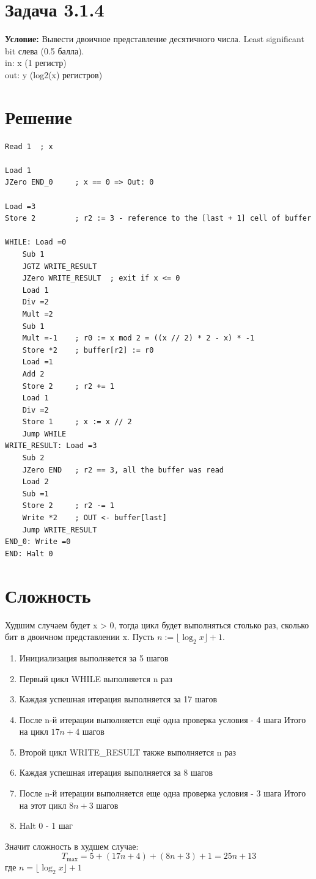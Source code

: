 \documentclass[12pt]{article}
\begin{document}
\section*{Задача 3.1.4}

\textbf{Условие:} Вывести двоичное представление десятичного числа. Least significant bit слева (0.5 балла).\\
in: x (1 регистр) \\
out: y (log2(x) регистров)

\section*{Решение}

\begin{verbatim}
Read 1  ; x

Load 1
JZero END_0     ; x == 0 => Out: 0

Load =3
Store 2         ; r2 := 3 - reference to the [last + 1] cell of buffer

WHILE: Load =0
    Sub 1
    JGTZ WRITE_RESULT
    JZero WRITE_RESULT  ; exit if x <= 0
    Load 1
    Div =2
    Mult =2
    Sub 1
    Mult =-1    ; r0 := x mod 2 = ((x // 2) * 2 - x) * -1
    Store *2    ; buffer[r2] := r0
    Load =1
    Add 2
    Store 2     ; r2 += 1
    Load 1
    Div =2
    Store 1     ; x := x // 2
    Jump WHILE
WRITE_RESULT: Load =3
    Sub 2
    JZero END   ; r2 == 3, all the buffer was read
    Load 2
    Sub =1
    Store 2     ; r2 -= 1
    Write *2    ; OUT <- buffer[last]
    Jump WRITE_RESULT
END_0: Write =0
END: Halt 0
\end{verbatim}

\section*{Сложность}

Худшим случаем будет x > 0, тогда цикл будет выполняться столько раз, сколько бит в двоичном представлении x. Пусть $n := \lfloor \log_2 x \rfloor + 1$.

\begin{enumerate}
    \item Инициализация выполняется за 5 шагов
    \item Первый цикл WHILE выполняется n раз
    \item Каждая успешная итерация выполняется за 17 шагов
    \item После n-й итерации выполняется ещё одна проверка условия - 4 шага
    Итого на цикл \(17n + 4\) шагов
    \item Второй цикл WRITE\_RESULT также выполняется n раз
    \item Каждая успешная итерация выполняется за 8 шагов
    \item После n-й итерации выполняется еще одна проверка условия - 3 шага
    Итого на этот цикл \(8n + 3\) шагов
    \item Halt 0 - 1 шаг
\end{enumerate}

Значит сложность в худшем случае:
\[
    T_{\max} = 5 + (17n + 4) + (8n + 3) + 1 = 25n + 13
\]
где $n = \lfloor \log_2 x \rfloor + 1$
\end{document}
